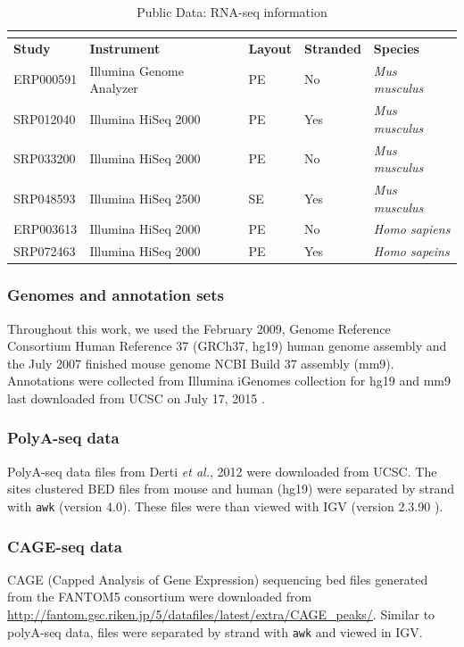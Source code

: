 \begin{longtabu} {X[.7,c]X[2,c]X[0.5,c]X[0.6,c]X[1,c]}
  \caption{Public Data: RNA-seq information}\\
  \label{table2:1}\\
  \toprule
  \textbf{Study} & \textbf{Instrument} & \textbf{Layout} & \textbf{Stranded} & \textbf{Species}\\
  \midrule
  \endhead
  ERP000591 & Illumina Genome Analyzer & PE & No  & \textit{Mus musculus}\\
  SRP012040 & Illumina HiSeq 2000      & PE & Yes & \textit{Mus musculus}\\
  SRP033200 & Illumina HiSeq 2000      & PE & No  & \textit{Mus musculus}\\
  SRP048593 & Illumina HiSeq 2500      & SE & Yes & \textit{Mus musculus}\\
  ERP003613 & Illumina HiSeq 2000      & PE & No  & \textit{Homo sapiens}\\
  SRP072463 & Illumina HiSeq 2000      & PE & Yes & \textit{Homo sapeins}\\
  \bottomrule
\end{longtabu}

\subsubsection{Genomes and annotation sets}
Throughout this work, we used the February 2009, Genome Reference Consortium Human Reference 37 (GRCh37, hg19) human genome assembly \cite{Lander2001} and the July 2007 finished mouse genome NCBI Build 37 assembly \cite{Chinwalla2002} (mm9). Annotations were collected from Illumina iGenomes collection for hg19 and mm9 last downloaded from UCSC on July 17, 2015 \cite{Rosenbloom2014}.

\subsubsection{PolyA-seq data}
PolyA-seq data files from Derti \emph{et al.}, 2012 \cite{Derti2012} were downloaded from UCSC. The sites clustered BED files from mouse and human (hg19) were separated by strand with \texttt{awk} (version 4.0). These files were than viewed with IGV (version 2.3.90 \cite{Thorvaldsdottir2013,Robinson2011}).

\subsubsection{CAGE-seq data}
CAGE (Capped Analysis of Gene Expression) sequencing bed files generated from the FANTOM5 consortium \cite{Lizio2015} were downloaded from \url{http://fantom.gsc.riken.jp/5/datafiles/latest/extra/CAGE_peaks/}. Similar to polyA-seq data, files were separated by strand with \texttt{awk} and viewed in IGV.

